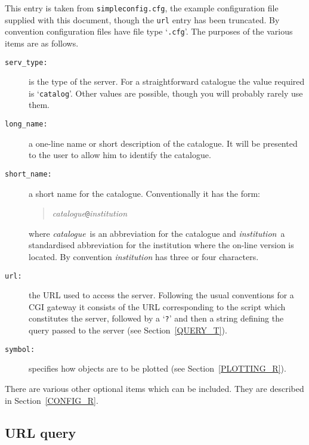 \documentclass[twoside,11pt,nolof,chapters]{starlink}
\begin{document}
This entry is taken from \texttt{simpleconfig.cfg}, the example configuration
file supplied with this document, though the \texttt{url} entry has been
truncated.  By convention configuration files have file type `\texttt{.cfg}'.
The purposes of the various items are as follows.

\begin{description}

  \item[\texttt{serv\_type:}] is the type of the server.  For a
   straightforward catalogue the value required is `\texttt{catalog}'.
   Other values are possible, though you will probably rarely use them.

  \item[\texttt{long\_name:}] a one-line name or short description of the
   catalogue.  It will be presented to the user to allow him to identify
   the catalogue.

  \item[\texttt{short\_name:}] a short name for the catalogue.  Conventionally
   it has the form:

  \begin{quote}
   \textit{catalogue}\texttt{@}\textit{institution}
  \end{quote}

   where \textit{catalogue}\, is an abbreviation for the catalogue and \textit{institution}\, a standardised abbreviation for the institution where
   the on-line version is located.  By convention \textit{institution}\/ has
   three or four characters.

  \item[\texttt{url:}] the URL used to access the server.  Following the
   usual conventions for a CGI gateway it consists of the URL corresponding
   to the script which constitutes the server, followed by a `\texttt{?}'
   and then a string defining the query passed to the server (see
   Section~\ref{QUERY_T}).

  \item[\texttt{symbol:}] specifies how objects are to be plotted (see
   Section~\ref{PLOTTING_R}).

\end{description}

There are various other optional items which can be included.  They are
described in Section~\ref{CONFIG_R}.

\subsection{\label{QUERY_T}URL query}
\end{document}
